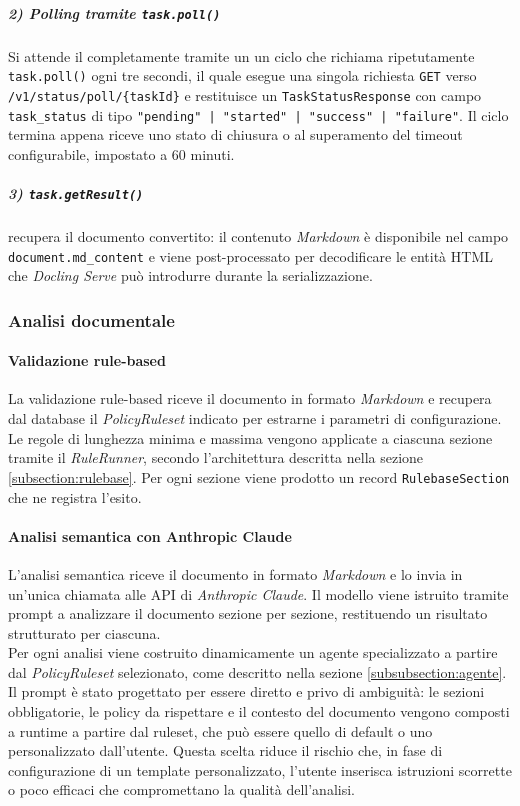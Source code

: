 \subparagraph{2) Polling tramite \texttt{task.poll()}} Si attende il completamente tramite un un ciclo che richiama ripetutamente \texttt{task.poll()} ogni tre secondi, il quale esegue una singola richiesta \texttt{GET} verso \texttt{/v1/status/poll/\{taskId\}} e restituisce un \texttt{TaskStatusResponse} con campo \texttt{task\_status} di tipo \texttt{"pending" | "started" | "success" | "failure"}. Il ciclo termina appena riceve uno stato di chiusura o al superamento del timeout configurabile, impostato a 60 minuti.

\subparagraph{3) \texttt{task.getResult()}} recupera il documento convertito: il contenuto \emph{Markdown} è disponibile nel campo \texttt{document.md\_content} e viene post-processato per decodificare le entità HTML che \emph{Docling Serve} può introdurre durante la serializzazione.

\subsubsection{Analisi documentale}
\paragraph{Validazione rule-based}
La validazione rule-based riceve il documento in formato \emph{Markdown} e recupera dal database il \emph{PolicyRuleset} indicato per estrarne i parametri di configurazione. Le regole di lunghezza minima e massima vengono applicate a ciascuna sezione tramite il \emph{RuleRunner}, secondo l'architettura descritta nella sezione \ref{subsection:rulebase}. Per ogni sezione viene prodotto un record \texttt{RulebaseSection} che ne registra l'esito.

\paragraph{Analisi semantica con Anthropic Claude}
L'analisi semantica riceve il documento in formato \emph{Markdown} e lo invia in un'unica chiamata alle API di \emph{Anthropic Claude}. Il modello viene istruito tramite prompt a analizzare il documento sezione per sezione, restituendo un risultato strutturato per ciascuna.\\

Per ogni analisi viene costruito dinamicamente un agente specializzato a partire dal \emph{PolicyRuleset} selezionato, come descritto nella sezione \ref{subsubsection:agente}. Il prompt è stato progettato per essere diretto e privo di ambiguità: le sezioni obbligatorie, le policy da rispettare e il contesto del documento vengono composti a runtime a partire dal ruleset, che può essere quello di default o uno personalizzato dall'utente. Questa scelta riduce il rischio che, in fase di configurazione di un template personalizzato, l'utente inserisca istruzioni scorrette o poco efficaci che compromettano la qualità dell'analisi.\\


